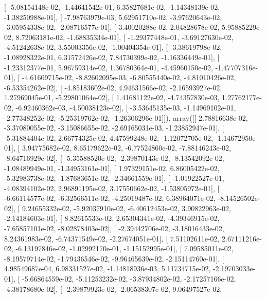 \documentclass{article}
\begin{document}
       [ -5.08154148e-02,  -1.44641542e-01,   6.35827681e-02,
         -1.14348139e-02,  -1.38250988e-01],
       [ -7.98763979e-03,   5.62951710e-02,  -3.97620643e-02,
         -3.05954338e-02,  -2.08716577e-01],
       [  3.40020288e-02,   2.04828678e-02,   5.95885229e-02,
          8.72063181e-02,  -1.68835334e-01],
       [ -1.29377448e-01,  -3.69127630e-02,  -4.51242638e-02,
          3.55003356e-02,  -1.00404354e-01],
       [ -3.38619798e-02,  -1.08928322e-01,   6.31572426e-02,
          7.84730399e-02,  -1.16336449e-01],
       [ -1.23312377e-01,   5.96759314e-02,   1.36780364e-01,
         -4.45960150e-02,  -1.47707316e-01],
       [ -4.61609715e-02,  -8.82602095e-03,  -6.80555440e-02,
         -4.81010426e-02,  -6.53354262e-02],
       [ -4.85183602e-02,   4.94631566e-02,  -2.16593927e-02,
          1.27969045e-01,  -5.29801064e-02],
       [  1.41681122e-02,  -4.74357830e-03,   1.27762177e-02,
         -6.92460362e-03,  -4.50038123e-02],
       [ -3.53645135e-03,  -1.14969102e-01,  -2.77348252e-02,
         -5.25319762e-02,  -1.26306296e-01]]), array([[  2.78816638e-02,  -3.37080055e-02,  -3.15086655e-02,
         -2.69165031e-03,  -1.23852947e-01],
       [ -5.31884404e-02,   2.66774325e-02,   4.47599248e-02,
         -1.12072705e-02,  -1.14672950e-01],
       [  3.94775682e-02,   8.65179622e-02,  -6.77524860e-02,
         -7.88146243e-02,  -8.64716929e-02],
       [ -5.35588520e-02,  -2.39870143e-02,  -8.13542092e-02,
         -1.08489949e-01,  -1.34953161e-01],
       [  1.97329151e-02,   6.86005422e-02,  -5.32983738e-02,
         -1.87683651e-02,  -2.34661559e-01],
       [ -1.01922527e-01,  -4.08394102e-02,   2.96891195e-02,
          3.17550662e-02,  -1.53805972e-01],
       [ -6.66114577e-02,  -6.32566511e-02,  -4.25019487e-02,
          6.38964071e-02,  -8.14526502e-02],
       [  9.24655332e-02,  -5.92037910e-02,  -6.40612453e-02,
          3.90822963e-02,  -2.14184603e-01],
       [  8.82615533e-02,   2.65304341e-02,  -4.39346915e-02,
         -7.65857101e-02,  -8.02878403e-02],
       [ -2.39442706e-02,  -3.18016433e-02,   8.24361983e-02,
         -6.74371549e-02,  -2.27674051e-01],
       [  7.51102611e-02,   2.67111216e-02,  -6.13197846e-02,
         -1.02992170e-01,  -1.15152995e-01],
       [  7.09585011e-02,  -8.19579714e-02,  -1.79436546e-02,
         -9.96465639e-02,  -2.15114760e-01],
       [  4.98549687e-04,   6.98331527e-02,  -1.14818936e-03,
          5.11734715e-02,  -2.19703033e-01],
       [ -5.66864559e-02,  -5.11253232e-02,  -3.87934802e-02,
         -2.17257166e-02,  -4.38178680e-02],
       [ -2.39879923e-02,  -2.06538307e-02,   9.06497527e-02,
\end{document}
